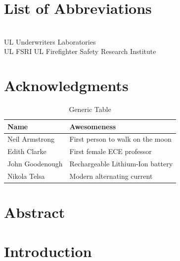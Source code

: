 \documentclass[12pt,oneside]{book}
\begin{document}
\newpage

\frontmatter

\pagestyle{plain}

\cleardoublepage
{}
\tableofcontents

\cleardoublepage
{}
{}
\listoffigures

\cleardoublepage
{}
{}
\listoftables

\chapter{List of Abbreviations}

\begin{tabbing}
\hspace{1.5in} \= \\
UL 	    \> Underwriters Laboratories \\
UL FSRI \> UL Firefighter Safety Research Institute \\
\end{tabbing}

\mainmatter

\chapter*{Acknowledgments}

\begin{table}[!ht]
	\centering
	\caption*{Generic Table}
	\begin{tabular}{ll}
		\toprule[1.5pt]
		Name & Awesomeness \\ 
		\midrule
		Neil Armstrong		 & First person to walk on the moon \\
		Edith Clarke		 & First female ECE professor \\
		John Goodenough		 & Rechargeable Lithium-Ion battery \\
		Nikola Telsa		 & Modern alternating current \\  
		\bottomrule[1.25pt]
	\end{tabular}
\end{table}

\newpage

\chapter*{Abstract}

\newpage
\chapter{Introduction}
\label{chap:intro}
\setcounter{page}{1}
\end{document}
